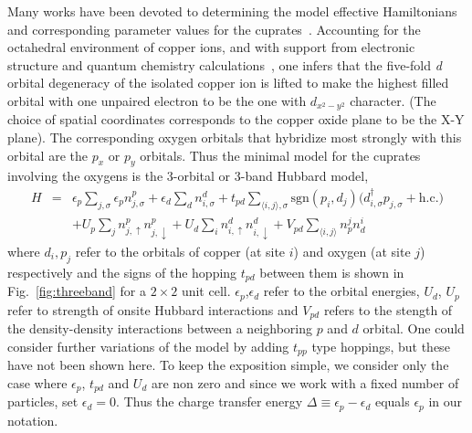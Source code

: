 \documentclass[prl,12pt,onecolumn,nofootinbib,notitlepage,english,superscriptaddress]{revtex4-1}
\begin{document}
Many works have been devoted to determining the model effective Hamiltonians and corresponding parameter 
values for the cuprates~\cite{Emery, ZhangRice, tJSpalek, Hybertsen_PRB1989, Hybertsen_PRB1990, Pavirini, Kent_Hubbard}. 
Accounting for the octahedral environment of copper ions, and with support from electronic structure 
and quantum chemistry calculations~\cite{Dagotto_RevModPhys}, one infers 
that the five-fold \emph{d} orbital degeneracy of the isolated copper ion is lifted to make the 
highest filled orbital with one unpaired electron to be the one with $d_{x^2-y^2}$ character. 
(The choice of spatial coordinates corresponds to the copper oxide plane to be the X-Y plane). 
The corresponding oxygen orbitals that hybridize most strongly with this orbital are the $p_x$ or $p_y$ orbitals. 
Thus the minimal model for the cuprates involving the oxygens 
is the 3-orbital or 3-band Hubbard model, 
\begin{eqnarray}
H &=&    \epsilon_p \sum_{j,\sigma} \epsilon_p n^{p}_{j,\sigma} + \epsilon_{d} \sum_{d}  n^{d}_{i,\sigma} 
	+ t_{pd} \sum_{\langle i,j \rangle, \sigma} \text{sgn}(p_i,d_j) \Big( d_{i,\sigma}^{\dagger} p_{j,\sigma} + \text{h.c.} \Big) \\
  & &   + U_p \sum_{j} n^{p}_{j,\uparrow} n^{p}_{j,\downarrow} + U_d \sum_{i} n^{d}_{i,\uparrow} n^{d}_{i,\downarrow} + V_{pd} \sum_{\langle i,j \rangle} n^{j}_p n^{i}_d 
\end{eqnarray}
where $d_i,p_j$ refer to the orbitals of copper (at site $i$) and oxygen (at site $j$)  respectively 
and the signs of the hopping $t_{pd}$ between them is shown in Fig.~\ref{fig:threeband} for a $2 \times 2$ unit cell. 
$\epsilon_p$,$\epsilon_d$ refer to the orbital energies, 
$U_d$, $U_p$ refer to strength of onsite Hubbard interactions and $V_{pd}$ refers to the 
stength of the density-density interactions between a neighboring $p$ and $d$ orbital. 
One could consider further variations of the model by adding $t_{pp}$ type hoppings, but 
these have not been shown here. To keep the exposition simple, we consider only 
the case where $\epsilon_p$, $t_{pd}$ and $U_{d}$ are non zero and 
since we work with a fixed number of particles, set $\epsilon_d = 0$. Thus the 
charge transfer energy $\Delta \equiv \epsilon_p - \epsilon_d$ equals $\epsilon_p$ in our notation. 
\end{document}
